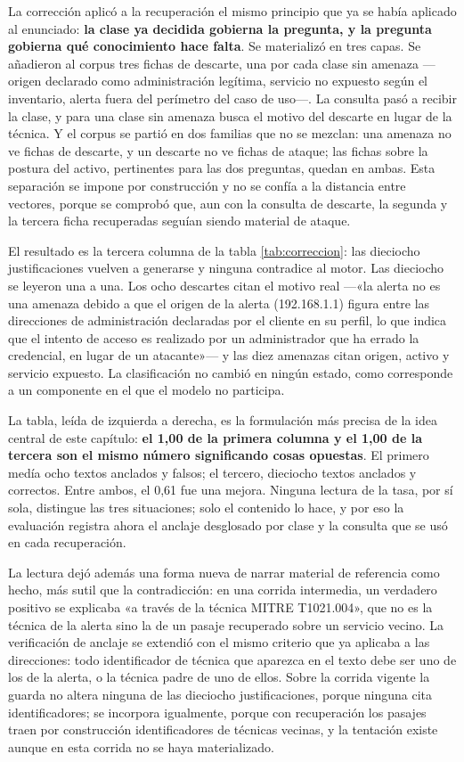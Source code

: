La corrección aplicó a la recuperación el mismo principio que ya se había aplicado al enunciado:
\textbf{la clase ya decidida gobierna la pregunta, y la pregunta gobierna qué conocimiento hace
falta}. Se materializó en tres capas. Se añadieron al corpus tres fichas de descarte, una por cada
clase sin amenaza ---origen declarado como administración legítima, servicio no expuesto según el
inventario, alerta fuera del perímetro del caso de uso---. La consulta pasó a recibir la clase, y
para una clase sin amenaza busca el motivo del descarte en lugar de la técnica. Y el corpus se
partió en dos familias que no se mezclan: una amenaza no ve fichas de descarte, y un descarte no
ve fichas de ataque; las fichas sobre la postura del activo, pertinentes para las dos preguntas,
quedan en ambas. Esta separación se impone por construcción y no se confía a la distancia entre
vectores, porque se comprobó que, aun con la consulta de descarte, la segunda y la tercera ficha
recuperadas seguían siendo material de ataque.

El resultado es la tercera columna de la tabla \ref{tab:correccion}: las dieciocho justificaciones
vuelven a generarse y ninguna contradice al motor. Las dieciocho se leyeron una a una. Los ocho
descartes citan el motivo real ---«la alerta no es una amenaza debido a que el origen de la alerta
(192.168.1.1) figura entre las direcciones de administración declaradas por el cliente en su
perfil, lo que indica que el intento de acceso es realizado por un administrador que ha errado la
credencial, en lugar de un atacante»--- y las diez amenazas citan origen, activo y servicio
expuesto. La clasificación no cambió en ningún estado, como corresponde a un componente en el que
el modelo no participa.

La tabla, leída de izquierda a derecha, es la formulación más precisa de la idea central de este capítulo:
\textbf{el 1,00 de la primera columna y el 1,00 de la tercera son el mismo número significando
cosas opuestas}. El primero medía ocho textos anclados y falsos; el tercero, dieciocho textos
anclados y correctos. Entre ambos, el 0,61 fue una mejora. Ninguna lectura de la tasa, por sí sola,
distingue las tres situaciones; solo el contenido lo hace, y por eso la evaluación registra ahora
el anclaje desglosado por clase y la consulta que se usó en cada recuperación.

La lectura dejó además una forma nueva de narrar material de referencia como hecho, más sutil que
la contradicción: en una corrida intermedia, un verdadero positivo se explicaba «a través de la
técnica MITRE T1021.004», que no es la técnica de la alerta sino la de un pasaje recuperado sobre
un servicio vecino. La verificación de anclaje se extendió con el mismo criterio que ya aplicaba a
las direcciones: todo identificador de técnica que aparezca en el texto debe ser uno de los de la
alerta, o la técnica padre de uno de ellos. Sobre la corrida vigente la guarda no altera ninguna de
las dieciocho justificaciones, porque ninguna cita identificadores; se incorpora igualmente,
porque con recuperación los pasajes traen por construcción identificadores de técnicas vecinas, y
la tentación existe aunque en esta corrida no se haya materializado.

